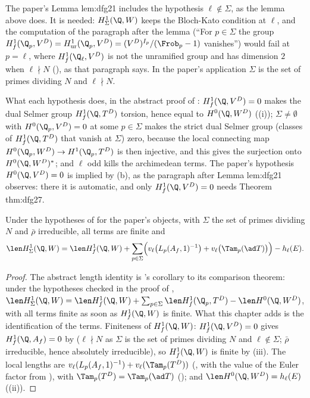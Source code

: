 \begin{paperlink}
The paper's Lemma lem:dfg21 includes the hypothesis $\ell\notin\Sigma$, as the lemma above does. It is needed: $H^1_\Sigma(\Q,W)$ keeps the Bloch-Kato condition at $\ell$, and
the computation of the paragraph after the lemma (``For $p\in\Sigma$ the group $H^1_f(\Q_p,V^D)=H^1_{\mathrm{ur}}(\Q_p,V^D)=(V^D)^{I_p}/(\Frob_p-1)$ vanishes'') would fail at
$p=\ell$, where $H^1_f(\Q_\ell,V^D)$ is not the unramified group and has dimension $2$ when $\ell\nmid N$ (), as that paragraph says.
In the paper's application $\Sigma$ is the set of primes dividing $N$ and $\ell\nmid N$.
\end{paperlink}

What each hypothesis does, in the abstract proof of : $H^1_f(\Q,V^D)=0$ makes the dual Selmer group $H^1_f(\Q,T^D)$ torsion, hence equal to
$H^0(\Q,W^D)$ ((i)); $\Sigma\ne\emptyset$ with $H^0(\Q_p,V^D)=0$ at some $p\in\Sigma$ makes the strict dual Selmer group (classes of $H^1_f(\Q,T^D)$ that vanish
at $\Sigma$) zero, because the local connecting map $H^0(\Q_p,W^D)\to H^1(\Q_p,T^D)$ is then injective, and this gives the surjection onto $H^0(\Q,W^D)^*$; and $\ell$ odd kills
the archimedean terms. The paper's hypothesis $H^0(\Q,V^D)=0$ is implied by (b), as the paragraph after Lemma lem:dfg21 observes: there it is automatic, and only
$H^1_f(\Q,V^D)=0$ needs Theorem thm:dfg27.

\begin{corollary}\label{cor:blochkato:length-identity}
Under the hypotheses of  for the paper's objects, with $\Sigma$ the set of primes dividing $N$ and $\bar\rho$ irreducible, all terms are finite and
\[
\len H^1_\Sigma(\Q,W)=\len H^1_f(\Q,W)+\sum_{p\in\Sigma}\Bigl(v_\ell\bigl(L_p(A_f,1)^{-1}\bigr)+v_\ell\bigl(\Tam_p(\ad T)\bigr)\Bigr)-h_\ell(E).
\]
\end{corollary}

\begin{proof}
The abstract length identity is 's corollary to its comparison theorem: under the hypotheses checked in the proof of ,
$\len H^1_\Sigma(\Q,W)=\len H^1_f(\Q,W)+\sum_{p\in\Sigma}\len H^1_f(\Q_p,T^D)-\len H^0(\Q,W^D)$, with all terms finite as soon as $H^1_f(\Q,W)$ is finite. What this chapter adds is
the identification of the terms. Finiteness of $H^1_f(\Q,W)$: $H^1_f(\Q,V^D)=0$ gives $H^1_f(\Q,A_f)=0$ by  ($\ell\nmid N$ as
$\Sigma$ is the set of primes dividing $N$ and $\ell\notin\Sigma$; $\bar\rho$ irreducible, hence absolutely irreducible), so $H^1_f(\Q,W)$ is finite by
(iii). The local lengths are $v_\ell(L_p(A_f,1)^{-1})+v_\ell(\Tam_p(T^D))$ (, with the value of the Euler factor
from ), with $\Tam_p(T^D)=\Tam_p(\ad T)$ (); and $\len H^0(\Q,W^D)=h_\ell(E)$ ((ii)).
\end{proof}

